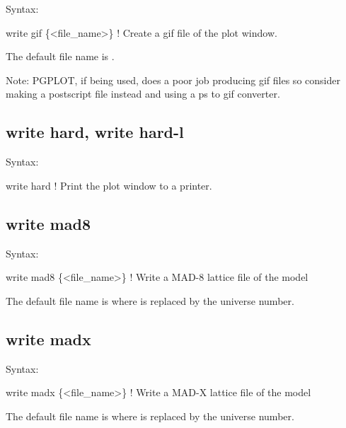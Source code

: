 {{{{{{{{{Syntax:
\begin{example}
    write gif \{<file_name>\}           ! Create a gif file of the plot window.
\end{example}

The default file name is .

Note: PGPLOT, if being used, does a poor job producing gif files so consider making a
postscript file instead and using a ps to gif converter.


\subsection{write hard, write hard-l}
\label{s:write.hard}

Syntax:
\begin{example}
    write hard                        ! Print the plot window to a printer.
\end{example}


\subsection{write mad8}
\label{s:write.mad8}

Syntax:
\begin{example}
    write mad8 \{<file_name>\}  ! Write a MAD-8 lattice file of the model
\end{example}

The default file name is  where \vn{\#} is replaced by the universe number. 


\subsection{write madx}
\label{s:write.madx}

Syntax:
\begin{example}
    write madx \{<file_name>\}  ! Write a MAD-X lattice file of the model
\end{example}

The default file name is  where \vn{\#} is replaced by the universe number. 


}}}}}}}}}
